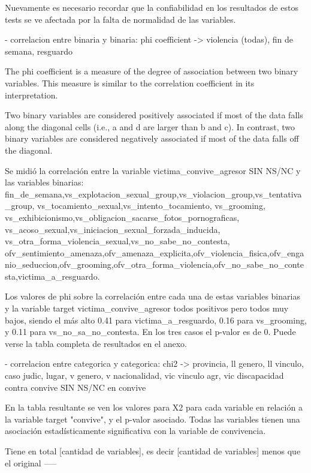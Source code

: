 \documentclass[10pt, spanish]{article}
\begin{document}
Nuevamente es necesario recordar que la confiabilidad en los resultados de estos tests se ve afectada por la falta de normalidad de las variables.


- correlacion entre binaria y binaria: phi coefficient -> violencia (todas), fin de semana,  resguardo

The phi coefficient is a measure of the degree of association between two binary variables. This measure is similar to the correlation coefficient in its interpretation.

Two binary variables are considered positively associated if most of the data falls along the diagonal cells (i.e., a and d are larger than b and c). In contrast, two binary variables are considered negatively associated if most of the data falls off the diagonal.

Se midió la correlación entre la variable victima_convive_agresor SIN NS/NC y las variables binarias: fin_de_semana,vs_explotacion_sexual_group,vs_violacion_group,vs_tentativa_group, vs_tocamiento_sexual,vs_intento_tocamiento, vs_grooming, vs_exhibicionismo,vs_obligacion_sacarse_fotos_pornograficas, vs_acoso_sexual,vs_iniciacion_sexual_forzada_inducida, vs_otra_forma_violencia_sexual,vs_no_sabe_no_contesta, ofv_sentimiento_amenaza,ofv_amenaza_explicita,ofv_violencia_fisica,ofv_enganio_seduccion,ofv_grooming,ofv_otra_forma_violencia,ofv_no_sabe_no_contesta,victima_a_resguardo. 

Los valores de phi sobre la correlación entre cada una de estas variables binarias y la variable target victima_convive_agresor todos positivos pero todos muy bajos, siendo el más alto 0.41 para victima_a_resguardo, 0.16 para vs_grooming, y 0.11 para vs_no_sa_no_contesta. En los tres casos el p-valor es de 0. Puede verse la tabla completa de resultados en el anexo.

- correlacion entre categorica y categorica: chi2 -> provincia, ll genero, ll vinculo, caso judic, lugar, v genero, v nacionalidad, vic vinculo agr, vic discapacidad contra convive
SIN NS/NC en convive

En la tabla resultante se ven los valores para X2 para cada variable en relación a la variable target "convive", y el p-valor asociado. Todas las variables tienen una asociación estadísticamente significativa con la variable de convivencia.
 
Tiene en total [cantidad de variables], es decir [cantidad de  variables] menos que el original 
-----
\end{document}
